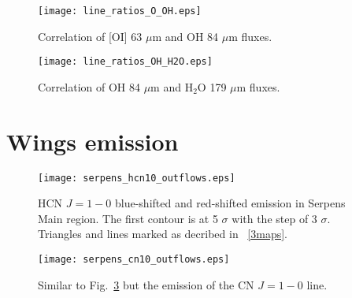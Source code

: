 \documentclass{aa}
\begin{document}
\begin{appendix}
\begin{figure}
\texttt{[image: line\_ratios\_O\_OH.eps]}
\caption{Correlation of [OI] 63 $\mu$m and OH 84 $\mu$m fluxes.}
\label{h13cn10}
\end{figure}

\begin{figure}
\texttt{[image: line\_ratios\_OH\_H2O.eps]}
\caption{Correlation of OH 84 $\mu$m and H$_2$O 179 $\mu$m fluxes.}
\label{h13cn10}
\end{figure}

\section{Wings emission}

\begin{figure}
\texttt{[image: serpens\_hcn10\_outflows.eps]}
\caption{HCN $J=1-0$ blue-shifted and red-shifted emission in Serpens Main region. The first contour is at 5 $\sigma$ with the step of 3 $\sigma$. Triangles and lines marked as decribed in ~\ref{3maps}.}
\label{hcn10_blue_red}
\end{figure}

\begin{figure}
\texttt{[image: serpens\_cn10\_outflows.eps]}
\caption{Similar to Fig.~\ref{hcn10_blue_red} but the emission of the CN $J=1-0$ line.}
\label{cn10_blue_red}
\end{figure}

\end{appendix}
\end{document}

